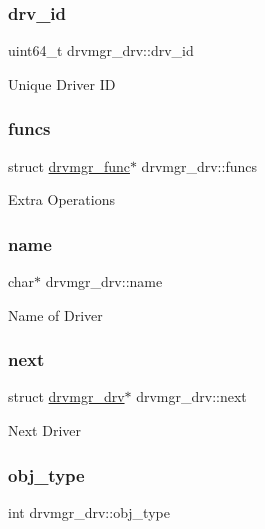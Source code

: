 \subsubsection{\texorpdfstring{drv\_id}{drv\_id}}
{\footnotesize\ttfamily uint64\+\_\+t drvmgr\+\_\+drv\+::drv\+\_\+id}

Unique Driver ID \mbox{\label{structdrvmgr__drv_a88e8e7dc6c20831cb09ad4ad8caf5151}} 
\subsubsection{\texorpdfstring{funcs}{funcs}}
{\footnotesize\ttfamily struct \mbox{\hyperlink{structdrvmgr__func}{drvmgr\+\_\+func}}$\ast$ drvmgr\+\_\+drv\+::funcs}

Extra Operations \mbox{\label{structdrvmgr__drv_a3f6e66aed68f0b6b8ad484ed524da08a}} 
\subsubsection{\texorpdfstring{name}{name}}
{\footnotesize\ttfamily char$\ast$ drvmgr\+\_\+drv\+::name}

Name of Driver \mbox{\label{structdrvmgr__drv_a5544e016abaca51a2baaa32406d13528}} 
\subsubsection{\texorpdfstring{next}{next}}
{\footnotesize\ttfamily struct \mbox{\hyperlink{structdrvmgr__drv}{drvmgr\+\_\+drv}}$\ast$ drvmgr\+\_\+drv\+::next}

Next Driver \mbox{\label{structdrvmgr__drv_ad6df87e2ef686e0aa0b3bed3f46b2590}} 
\subsubsection{\texorpdfstring{obj\_type}{obj\_type}}
{\footnotesize\ttfamily int drvmgr\+\_\+drv\+::obj\+\_\+type}

